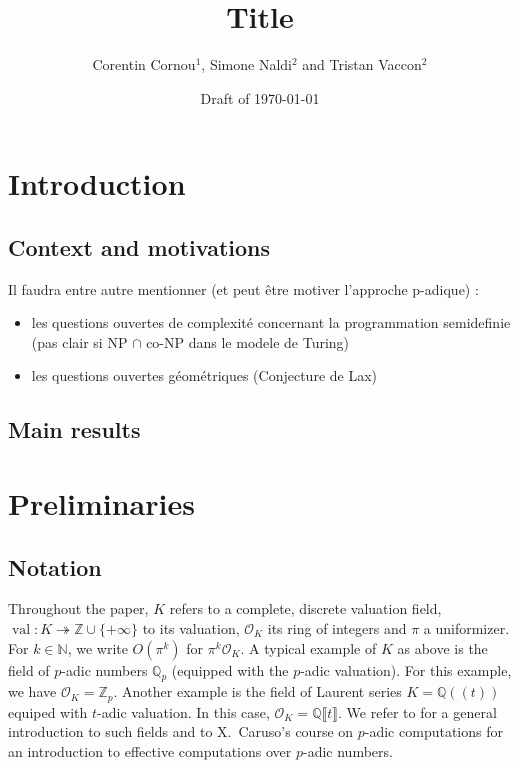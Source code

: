 \documentclass[a4paper,12pt]{article}
\title{\bf Title}
\newcommand{\N}{\mathbb{N}} %
\DeclareMathOperator{\val}{val}
\def\QQ{\ensuremath{\mathbb{Q}}}
\def\ZZ{\ensuremath{\mathbb{Z}}}
\newcommand{\OK}{\mathcal{O}_K}
\begin{document}
\author{Corentin Cornou$^{1}$, Simone Naldi$^2$ and Tristan Vaccon$^2$}


\date{Draft of \today}

\maketitle

\begin{abstract}
\end{abstract}


\tableofcontents


\section{Introduction}

\subsection{Context and motivations}

Il faudra entre autre mentionner (et peut être motiver l'approche p-adique) :
\begin{itemize}
\item les questions ouvertes de complexité concernant la programmation semidefinie (pas clair si NP $\cap$ co-NP
  dans le modele de Turing)
\item les questions ouvertes géométriques (Conjecture de Lax)
\end{itemize}


\subsection{Main results}



\section{Preliminaries}

\subsection{Notation}

Throughout the paper, $K$ refers to a complete,
discrete valuation field, $\val : K \twoheadrightarrow \ZZ \cup \{+\infty\}$ to its valuation,
$\OK$ its ring of integers and $\pi$ a uniformizer.
For $k \in \N$, we write $O(\pi^k)$ for $\pi^k \OK$.
A typical example of $K$ as above is the field of $p$-adic numbers 
$\QQ_p$ (equipped with the $p$-adic valuation). For this example, we 
have $\OK = \ZZ_p$.
Another example is the field of Laurent series
$K=\QQ(\!(t)\!)$ equiped with $t$-adic valuation.
In this case, $\OK = \QQ \llbracket t \rrbracket$.
We refer to \cite{Serre:1979} for a
general introduction to such fields
and to X.~Caruso's course on $p$-adic computations \cite{caruso_computations_2017}
for an introduction to effective computations over $p$-adic numbers.
\end{document}
